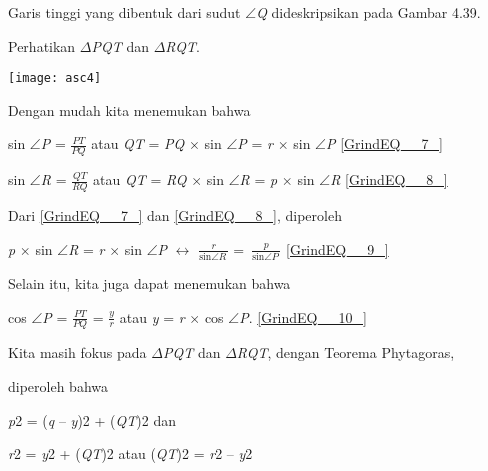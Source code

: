 \documentclass[11pt,fleqn]{book} %
\begin{document}
\begin{myEnumerate}
\begin{itemize}
Garis tinggi yang dibentuk dari sudut $\mathrm{\angle }$\textit{Q }dideskripsikan pada Gambar 4.39.\textit{}

Perhatikan $\Delta$\textit{PQT }dan $\Delta$\textit{RQT}.



\noindent \texttt{[image: asc4]}

\noindent Dengan mudah kita menemukan bahwa

\noindent 

\noindent sin $\mathrm{\angle }$\textit{P }= $\frac{PT}{PQ}$\textit{ }atau \textit{QT }= \textit{PQ }$\times$ sin $\mathrm{\angle }$\textit{P }= \textit{r }$\times$ sin $\mathrm{\angle }$\textit{P}     \eqref{GrindEQ__7_}

\noindent sin $\mathrm{\angle }$\textit{R }=\textit{ }$\frac{QT}{RQ}$ atau \textit{QT }= \textit{RQ }$\times$ sin $\mathrm{\angle }$\textit{R }= \textit{p }$\times$ sin $\mathrm{\angle }$\textit{R}     \eqref{GrindEQ__8_}

\noindent 

\noindent Dari \eqref{GrindEQ__7_} dan \eqref{GrindEQ__8_}, diperoleh

\noindent \textit{}

\noindent \textit{p }$\times$ sin $\mathrm{\angle }$\textit{R }= \textit{r }$\times$ sin $\mathrm{\angle }$\textit{P }$\mathrm{\leftrightarrow}$ $\frac{r}{{\mathrm{sin} \mathrm{\angle }R\ }}=\ \frac{p}{{\mathrm{sin} \mathrm{\angle }P\ }}$       \eqref{GrindEQ__9_}

\noindent 

\noindent Selain itu, kita juga dapat menemukan bahwa

\noindent 

\noindent cos $\mathrm{\angle }$\textit{P }= $\frac{PT}{PQ}$\textit{ }= $\frac{y}{r}$ atau \textit{y }= \textit{r }$\times$ cos $\mathrm{\angle }$\textit{P}.        \eqref{GrindEQ__10_}

\noindent \textit{}

\noindent Kita masih fokus pada $\Delta$\textit{PQT }dan $\Delta$\textit{RQT}, dengan Teorema Phytagoras,

\noindent diperoleh bahwa

\noindent \textit{}

\noindent \textit{p}2 = (\textit{q }-- \textit{y})2 + (\textit{QT})2 dan 

\noindent \textit{r}2 = \textit{y}2 + (\textit{QT})2 atau (\textit{QT})2 = \textit{r}2 -- \textit{y}2


\end{itemize}
\end{myEnumerate}
\end{document}
